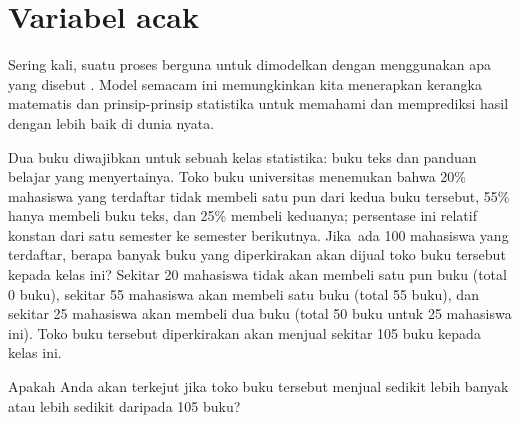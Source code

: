 \section{Variabel acak}
\label{randomVariablesSection}


\noindent%
Sering kali, suatu proses berguna untuk dimodelkan dengan menggunakan apa yang
disebut .
Model semacam ini memungkinkan kita menerapkan kerangka
matematis dan prinsip-prinsip statistika untuk
memahami dan memprediksi hasil dengan lebih baik
di dunia nyata.

\begin{examplewrap}
\begin{nexample}{Dua buku diwajibkan untuk sebuah kelas statistika: buku teks dan panduan belajar yang menyertainya. Toko buku universitas menemukan bahwa 20\% mahasiswa yang terdaftar tidak membeli satu pun dari kedua buku tersebut, 55\% hanya membeli buku teks, dan 25\% membeli keduanya; persentase ini relatif konstan dari satu semester ke semester berikutnya. Jika~ada 100 mahasiswa yang terdaftar, berapa banyak buku yang diperkirakan akan dijual toko buku tersebut kepada kelas ini?}\label{bookStoreSales}
Sekitar 20 mahasiswa tidak akan membeli satu pun buku (total 0 buku), sekitar 55 mahasiswa akan membeli satu buku (total 55 buku), dan sekitar 25 mahasiswa akan membeli dua buku (total 50 buku untuk 25 mahasiswa ini). Toko buku tersebut diperkirakan akan menjual sekitar 105 buku kepada kelas ini.
\end{nexample}
\end{examplewrap}

\begin{exercisewrap}
\begin{nexercise}
Apakah Anda akan terkejut jika toko buku tersebut menjual sedikit lebih banyak atau lebih sedikit daripada 105 buku?\footnotemark
\end{nexercise}
\end{exercisewrap}

